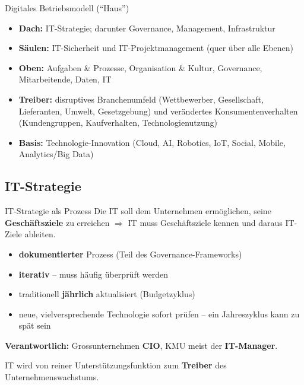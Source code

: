 \documentclass[a4paper, fontsize=7pt]{scrartcl}
\begin{document}
\begin{subbox}{Digitales Betriebsmodell (``Haus'')}
\begin{itemize}
    \item \textbf{Dach:} IT-Strategie; darunter Governance, Management,
          Infrastruktur
    \item \textbf{Säulen:} IT-Sicherheit und IT-Projektmanagement (quer
          über alle Ebenen)
    \item \textbf{Oben:} Aufgaben \& Prozesse, Organisation \& Kultur,
          Governance, Mitarbeitende, Daten, IT
    \item \textbf{Treiber:} disruptives Branchenumfeld (Wettbewerber,
          Gesellschaft, Lieferanten, Umwelt, Gesetzgebung) und verändertes
          Konsumentenverhalten (Kundengruppen, Kaufverhalten,
          Technologienutzung)
    \item \textbf{Basis:} Technologie-Innovation (Cloud, AI, Robotics, IoT,
          Social, Mobile, Analytics/Big Data)
\end{itemize}
\end{subbox}

\subsection{IT-Strategie}

\begin{mainbox}{IT-Strategie als Prozess}
Die IT soll dem Unternehmen ermöglichen, seine \textbf{Geschäftsziele} zu
erreichen $\Rightarrow$ IT muss Geschäftsziele kennen und daraus IT-Ziele
ableiten.
\begin{itemize}
    \item \textbf{dokumentierter} Prozess (Teil des Governance-Frameworks)
    \item \textbf{iterativ} -- muss häufig überprüft werden
    \item traditionell \textbf{jährlich} aktualisiert (Budgetzyklus)
    \item neue, vielversprechende Technologie sofort prüfen -- ein
          Jahreszyklus kann zu spät sein
\end{itemize}
\textbf{Verantwortlich:} Grossunternehmen \textbf{CIO}, KMU meist der
\textbf{IT-Manager}.

IT wird von reiner Unterstützungsfunktion zum \textbf{Treiber} des
Unternehmenswachstums.
\end{mainbox}
\end{document}
